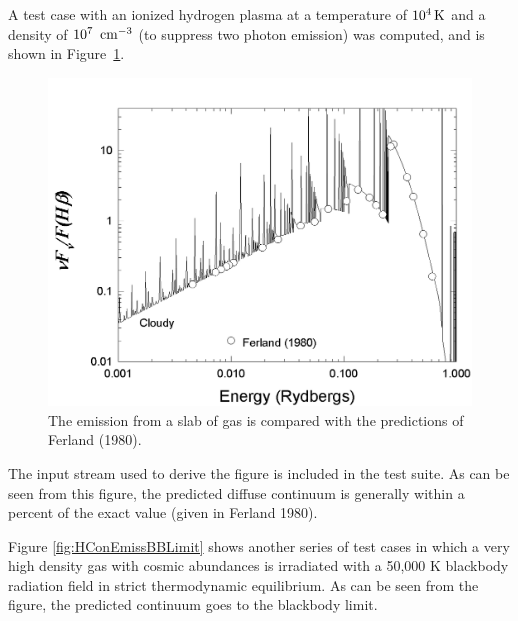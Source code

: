 A test case with an ionized hydrogen plasma at a temperature
of $10^4 {\rm\thinspace K}$ and
a density of $10^7~{\rm\thinspace cm^{-3}}$
(to suppress two photon emission) was computed, and
is shown in Figure~\ref{fig:HemisCompareFerland80}.

\begin{figure}
\centering
\label{fig:HemisCompareFerland80}
\includegraphics[scale=0.8]{HemisCompareFerland80}
\caption[H emission comparision]{The emission from a slab of gas is compared with the
predictions of Ferland (1980).}%
\end{figure}

The input stream used to derive the figure is included in the test suite.
As can be seen from this figure, the predicted diffuse continuum is generally
within a percent of the exact value (given in Ferland 1980).

Figure \ref{fig:HConEmissBBLimit} shows another series of test cases in which a very high density
gas with cosmic abundances is irradiated with a 50,000 K blackbody radiation
field in strict thermodynamic equilibrium.  As can be seen from the figure,
the predicted continuum goes to the blackbody limit.

